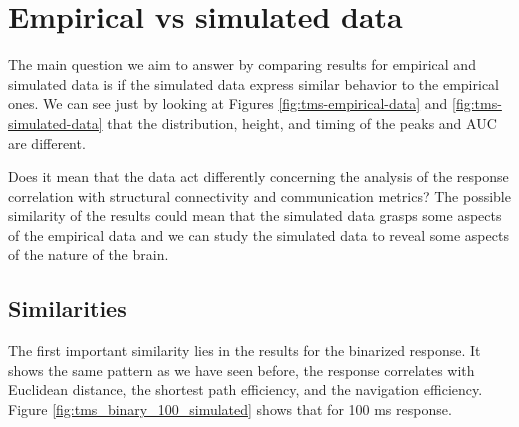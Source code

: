 \section{Empirical vs simulated data}

The main question we aim to answer by comparing results for empirical and simulated data is if the simulated data express similar behavior to the empirical ones. We can see just by looking at Figures \ref{fig:tms-empirical-data} and \ref{fig:tms-simulated-data} that the distribution, height, and timing of the peaks and AUC are different. 

Does it mean that the data act differently concerning the analysis of the response correlation with structural connectivity and communication metrics? The possible similarity of the results could mean that the simulated data grasps some aspects of the empirical data and we can study the simulated data to reveal some aspects of the nature of the brain.

\subsection{Similarities}

The first important similarity lies in the results for the binarized response. It shows the same pattern as we have seen before, the response correlates with Euclidean distance, the shortest path efficiency, and the navigation efficiency. Figure \ref{fig:tms_binary_100_simulated} shows that for 100 ms response. 

